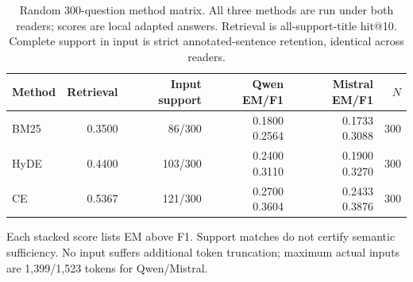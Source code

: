 \begin{table}[htbp]
\centering\footnotesize
\setlength{\tabcolsep}{3pt}
\renewcommand{\arraystretch}{1.08}
\caption{Random 300-question method matrix. All three methods are run under both readers; scores are local adapted answers. Retrieval is all-support-title hit@10. Complete support in input is strict annotated-sentence retention, identical across readers.}
\label{tab:followup_holdout_summary}
\begin{tabularx}{\textwidth}{l r r r r r}
\toprule
Method & Retrieval & Input support & Qwen EM/F1 & Mistral EM/F1 & $N$ \\
\midrule
BM25 & 0.3500 & 86/300 & \shortstack{0.1800\\0.2564} & \shortstack{0.1733\\0.3088} & 300 \\
HyDE & 0.4400 & 103/300 & \shortstack{0.2400\\0.3110} & \shortstack{0.1900\\0.3270} & 300 \\
CE & 0.5367 & 121/300 & \shortstack{0.2700\\0.3604} & \shortstack{0.2433\\0.3876} & 300 \\
\bottomrule
\end{tabularx}
\begin{tablenotes}\footnotesize
\item Each stacked score lists EM above F1. Support matches do not certify semantic sufficiency. No input suffers additional token truncation; maximum actual inputs are 1,399/1,523 tokens for Qwen/Mistral.
\end{tablenotes}
\end{table}

